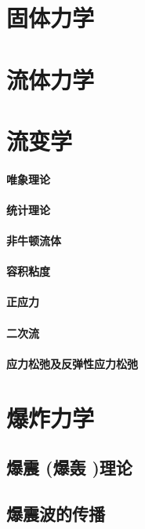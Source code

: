 \documentclass[UTF8]{../06-Physics}
\begin{document}
\chapter{固体力学}%



    
\chapter{流体力学}%



\chapter{流变学}
    \subsubsection{唯象理论}
    \subsubsection{统计理论}
    \subsubsection{非牛顿流体}
    \subsubsection{容积粘度}
    \subsubsection{正应力}
    \subsubsection{二次流}
    \subsubsection{应力松弛及反弹性应力松弛}


\chapter{爆炸力学}
\section{爆震 (爆轰 )理论}
\section{爆震波的传播}
\end{document}
